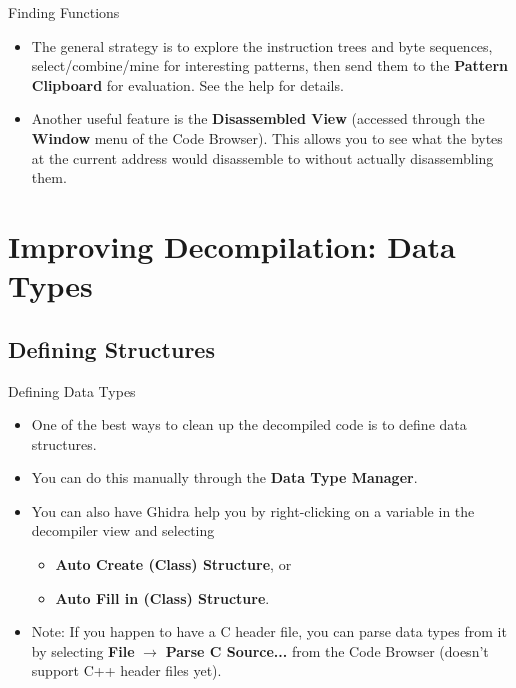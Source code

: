 \documentclass{beamer}
\begin{document}
\begin{frame}
\begin{block}{Finding Functions}
\begin{itemize}
\item The general strategy is to explore the instruction trees and byte sequences, select/combine/mine for interesting patterns, then send them to the \textbf{Pattern Clipboard} for
evaluation.  See the help for details.
\item Another useful feature is the \textbf{Disassembled View} (accessed through the \textbf{Window} menu of the Code Browser).  This allows you to see what the bytes at the current
address would disassemble to without actually disassembling them.
\end{itemize}
\end{block}
\end{frame}


\section{Improving Decompilation: Data Types}

\subsection{Defining Structures}

\begin{frame}
\begin{block}{Defining Data Types}
\begin{itemize}
\item One of the best ways to clean up the decompiled code is to define data structures.
\item You can do this manually through the \textbf{Data Type Manager}.
\item You can also have Ghidra help you by right-clicking on a variable in the decompiler view and selecting 
\begin{itemize}
\item \textbf{Auto Create (Class) Structure}, or 
\item \textbf{Auto Fill in (Class) Structure}.
\end{itemize}
\item Note: If you happen to have a C header file, you can parse data types from it by selecting \textbf{File} $\rightarrow$ \textbf{Parse C Source...} from the Code Browser
(doesn't support C++ header files yet).
\end{itemize}
\end{block}
\end{frame}
\end{document}
